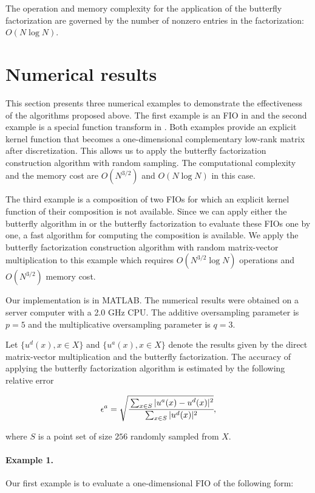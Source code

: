 The operation and memory complexity for the application of the butterfly factorization are governed by the number of nonzero entries in the factorization: $O(N\log N)$.

\section{Numerical results}
\label{sec:results}
This section presents three numerical examples to demonstrate the effectiveness of the algorithms proposed above.  The first example is an FIO in \cite{FIO09} and the second example is a special function transform in \cite{Butterfly2}. Both examples provide an explicit kernel function that becomes a one-dimensional complementary low-rank matrix after discretization.  This allows us to apply the butterfly factorization construction algorithm with random sampling. The computational complexity and the memory cost are $O(N^{3/2})$ and
$O(N\log N)$ in this case.

The third example is a composition of two FIOs for which an explicit kernel function of their composition is not available.  Since we can apply either the butterfly algorithm in \cite{FIO09} or the butterfly factorization to evaluate these FIOs one by one, a fast algorithm for computing the composition is available. We apply the butterfly factorization construction algorithm with random matrix-vector multiplication to this example which requires $O(N^{3/2}\log N)$ operations and $O(N^{3/2})$ memory cost.

Our implementation is in MATLAB.  The numerical results were obtained on a server computer with a 2.0 {GHz CPU}. The additive oversampling parameter is $p=5$ and the multiplicative oversampling parameter is $q=3$.

Let $\{u^d(x),x\in X\}$ and $\{u^a(x),x\in X\}$ denote the results given by the direct matrix-vector multiplication and the butterfly factorization.  The accuracy of applying the butterfly factorization algorithm is estimated by the following relative error

\begin{equation}
\epsilon^a = \sqrt{\cfrac{\sum_{x\in S}|u^a(x)-u^d(x)|^2}
{\sum_{x\in S}|u^d(x)|^2}},
\end{equation}

where $S$ is a point set of size $256$ randomly sampled from $X$.

\paragraph{Example 1.} Our first example is to evaluate a one-dimensional FIO of the following form:

